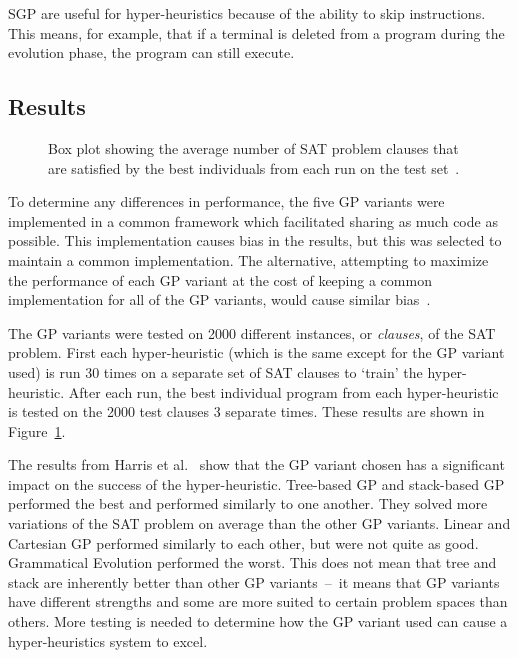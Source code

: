 \documentclass{sig-alternate}
\begin{document}
SGP are useful for hyper-heuristics because of the ability to skip instructions. This means, for example, that if a terminal is deleted from a program during the evolution phase, the program can still execute.

\subsection{Results}
\label{sec:gpresults}
\begin{figure}
	\centering
	\caption{Box plot showing the average number of SAT problem clauses that are satisfied by the best individuals from each run on the test set~\cite{harris:2015}.}
	\label{fig:gpvariants}
\end{figure}

To determine any differences in performance, the five GP variants were implemented in a common framework which facilitated sharing as much code as possible. This implementation causes bias in the results, but this was selected to maintain a common implementation. The alternative, attempting to maximize the performance of each GP variant at the cost of keeping a common implementation for all of the GP variants, would cause similar bias~\cite{harris:2015}.

The GP variants were tested on 2000 different instances, or \textit{clauses}, of the SAT problem. First each hyper-heuristic (which is the same except for the GP variant used) is run 30 times on a separate set of SAT clauses to `train' the hyper-heuristic. After each run, the best individual program from each hyper-heuristic is tested on the 2000 test clauses 3 separate times. These results are shown in Figure~\ref{fig:gpvariants}.

The results from Harris et al.~\cite{harris:2015} show that the GP variant chosen has a significant impact on the success of the hyper-heuristic. Tree-based GP and stack-based GP performed the best and performed similarly to one another. They solved more variations of the SAT problem on average than the other GP variants. Linear and Cartesian GP performed similarly to each other, but were not quite as good. Grammatical Evolution performed the worst. This does not mean that tree and stack are inherently better than other GP variants~--~it means that GP variants have different strengths and some are more suited to certain problem spaces than others. More testing is needed to determine how the GP variant used can cause a hyper-heuristics system to excel.
\end{document}
